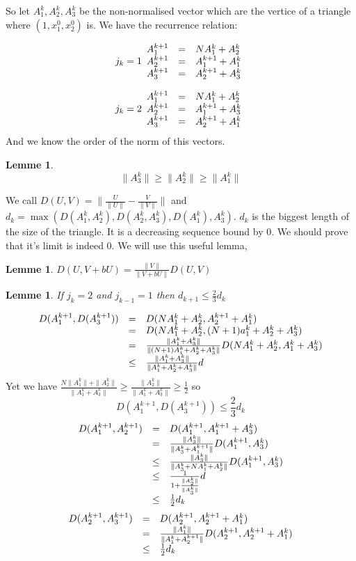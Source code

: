 \documentclass[12pt]{article}
\theoremstyle{plain}%
\newtheorem{lem}[thm]{Lemme}
\theoremstyle{definition}
\theoremstyle{remark}
\begin{document}
So let $A_1^k,A_2^k,A_3^k$ be the non-normalised vector which are the vertice of a triangle where $(1,x_1^0,x_2^0)$ is. We have the recurrence relation:

\[j_k=1
\begin{array}{c c l}
A_1^{k+1} & = & N A_1^k+A_2^k\\
A_2^{k+1} & = & A_1^{k+1} + A_1^k \\
A_3^{k+1} & = & A_2^{k+1} + A_3^k
\end{array}
\]

\[j_k=2
\begin{array}{c c l}
A_1^{k+1} & = & N A_1^k+A_2^k\\
A_2^{k+1} & = & A_1^{k+1} + A_3^k \\
A_3^{k+1} & = & A_2^{k+1} + A_1^k
\end{array}
\]
And we know the order of the norm of this vectors.
\begin{lem}
\[
\|A_3^k \| \geq \|A_2^k\| \geq \|A_1^k \|
\]
\end{lem}
We call $D(U,V)=\|\frac{U}{\|U \|}- \frac{V}{\|V\|}\|$ and $d_k=\max(D(A_1^k,A_2^k),D(A_2^k,A_3^k),D(A_1^k),A_3^k)$. $d_k$ is the biggest length of the size of the triangle. It is a decreasing sequence bound by $0$. We should prove that it's limit is indeed $0$.\newline
We will use this useful lemma,
\begin{lem}
 $D(U,V+b U)=\frac{\|V\|}{\|V+b U\|}D(U,V)$
\end{lem}
\begin{lem}
If $j_k=2$ and $j_{k-1}=1$ then $d_{k+1} \leq \frac{2}{3} d_k$
\end{lem}
\[
\begin{array}{c c l}
D(A_1^{k+1},D(A_3^{k+1})) & = & D(N A_1^k + A_2^k,A_2^{k+1}+A_1^k)\\
 & = & D(N A_1^k + A_2^k,(N+1)a_1^k+A_2^k+A_3^k) \\
 & = & \frac{\|A_1^k+A_3^k\|}{\|(N+1)A_1^k+A_2^k+A_3^k\|}D(NA_1^k+A_2^k,A_1^k+A_3^k)\\
 & \leq & \frac{\|A_1^k+A_3^k\|}{\|A_1^k+A_2^k+A_3^k\|} d
\end{array}
\]
Yet we have $\frac{N \|A_1^k\|+\|A_2^k\|}{\|A_1^k+A_3^k\|} \geq \frac{\|A_2^k\|}{\|A_1^k+A_3^k\|} \geq \frac{1}{2}$ so \[
D(A_1^{k+1},D(A_3^{k+1})) \leq \frac{2}{3} d_k
\]
\[
\begin{array}{c c l}
D(A_1^{k+1},A_2^{k+1}) & = & D(A_1^{k+1},A_1^{k+1}+A_3^k) \\
& = & \frac{\|A_3^k\|}{\|A_3^k+A_1^{k+1}\|}D(A_1^{k+1},A_3^k)\\
& \leq & \frac{\|A_3^k\|}{\|A_3^k+N A_1^k+A_2^k\|}D(A_1^{k+1},A_3^k)\\
& \leq & \frac{1}{1+\frac{\|A_2^k\|}{\|A_3^k\|}} d\\
& \leq & \frac{1}{2} d_k
\end{array}
\]
\[
\begin{array}{c c l}
D(A_2^{k+1},A_3^{k+1}) & = & D(A_2^{k+1},A_2^{k+1}+A_1^k) \\
& = &\frac{\|A_1^k\|}{\|A_1^k+A_2^{k+1}\|} D(A_2^{k+1},A_2^{k+1}+A_1^k)\\
& \leq & \frac{1}{2} d_k
\end{array}
\]
\end{document}
